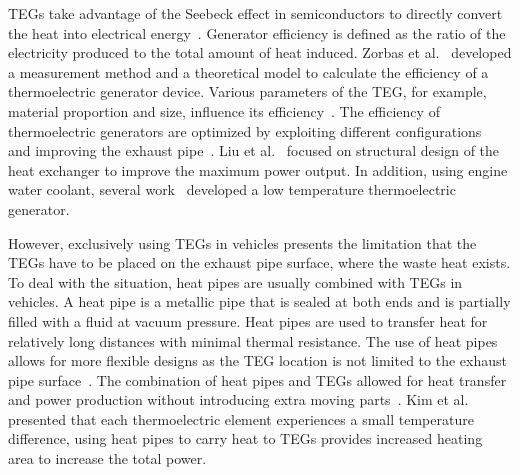 TEGs take advantage of the Seebeck effect in semiconductors to directly convert the heat into electrical energy~\cite{JX_54,JX_60,JX_76}. Generator efficiency is defined as the ratio of the electricity produced to the total amount of heat induced. Zorbas et al.~\cite{JX_76} developed a measurement method and a theoretical model to calculate the efficiency of a thermoelectric generator device. Various parameters of the TEG, for example, material proportion and size, influence its efficiency~\cite{JX_18}. The efficiency of thermoelectric generators are optimized by exploiting different configurations~\cite{JX_27,JX_43} and improving the exhaust pipe~\cite{JX_71}. Liu et al.~\cite{JX_44} focused on structural design of the heat exchanger to improve the maximum power output. In addition, using engine water coolant, several work~\cite{JX_7,JX_35} developed a low temperature thermoelectric generator.

However, exclusively using TEGs in vehicles presents the limitation that the TEGs have to be placed on the exhaust pipe surface, where the waste heat exists. To deal with the situation, heat pipes are usually combined with TEGs in vehicles. A heat pipe is a metallic pipe that is sealed at both ends and is partially filled with a fluid at vacuum pressure. Heat pipes are used to transfer heat for relatively long distances with minimal thermal resistance. The use of heat pipes allows for more flexible designs as the TEG location is not limited to the exhaust pipe surface~\cite{JX_56}. The combination of heat pipes and TEGs allowed for heat transfer and power production without introducing extra moving parts~\cite{JX_36,JX_44,JX_56}. Kim et al.~\cite{JX_36} presented that each thermoelectric element experiences a small temperature difference, using heat pipes to carry heat to TEGs provides increased heating area to increase the total power.

%
